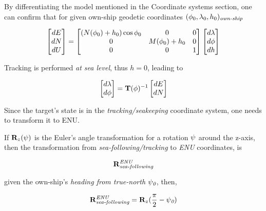 By differentiating the model mentioned in the Coordinate systems section, one can confirm that for given own-ship geodetic coordinates $({\phi}_0,{\lambda}_0, h_0)_{\textit{own-ship}}$



\begin{equation}
\label{eq:ENUgeodifferences}
\begin{bmatrix}
dE\\dN\\dU
\end{bmatrix}=
\begin{bmatrix}
(N({\phi}_0)+h_0)\cos{\phi}_0 &0 &0\\
0 &M({\phi}_0) + h_0 &0\\
0 &0 &1
\end{bmatrix}
\begin{bmatrix}
d{\lambda}\\d{\phi}\\dh
\end{bmatrix}
\end{equation}


Tracking is performed \emph{at sea level}, thus $h=0$, leading to


\begin{equation}
\begin{bmatrix}
d{\lambda}\\ d{\phi}
\end{bmatrix}=
\mathbf{T}({\phi})^{-1}
\begin{bmatrix}
dE\\ dN
\end{bmatrix}
\end{equation}



Since the target's state is in the \emph{tracking/seakeeping} coordinate system, one needs to transform it to ENU.

If $\mathbf{R}_z({\psi})$ is the Euler's angle transformation for a rotation ${\psi}$ around the z-axis, then the transformation from \emph{sea-following/tracking} to \emph{ENU} coordinates, is

$$\mathbf{R}^{\textit{ENU}}_{\textit{sea-following}} $$

given the own-ship's \emph{heading from true-north} ${\psi}_{\textit{0}}$, then,


\begin{equation}
\mathbf{R}_{\textit{sea-following}}^{\textit{ENU}} = \mathbf{R}_{z}(\frac{\pi}{2}-{\psi}_{\textit{0}})
\end{equation}


